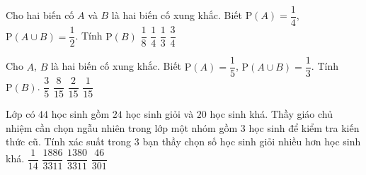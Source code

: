 \begin{ex}%
	Cho hai biến cố $A$ và $B$ là hai biến cố xung khắc. Biết $\mathrm{P}(A)=\dfrac{1}{4}$, $\mathrm{P}(A\cup B)=\dfrac{1}{2}$.  Tính $\mathrm{P}(B)$
	 \choice
		{$\dfrac{1}{8}$} 
		{\True  $\dfrac{1}{4}$}
		{$\dfrac{1}{3}$} 
		 {$\dfrac{3}{4}$}
\end{ex}

\begin{ex}%
	Cho $A$, $B$ là hai  biến cố xung khắc. Biết $\mathrm{P}(A)=\dfrac{1}{5}$, $\mathrm{P}(A\cup B)=\dfrac{1}{3}$. Tính $\mathrm{P}(B)$.
	 \choice
		 {$\dfrac{3}{5}$}
		{$\dfrac{8}{15}$} 
		{\True $\dfrac{2}{15}$} 
		 {$\dfrac{1}{15}$}
\end{ex}

\begin{ex}%
	Lớp có $44$ học sinh gồm $24$ học sinh giỏi và $20$ học sinh khá. Thầy giáo chủ nhiệm cần chọn ngẫu nhiên trong lớp một  nhóm gồm $3$ học sinh để kiểm tra kiến thức cũ. Tính xác suất trong $3$ bạn thầy chọn số học sinh giỏi nhiều hơn học sinh khá.
	\choice 
		 {$\dfrac{1}{14}$}
		{\True  $\dfrac{1886}{3311}$}
		{$\dfrac{1380}{3311}$} 
		 {$\dfrac{46}{301}$}
\end{ex}

